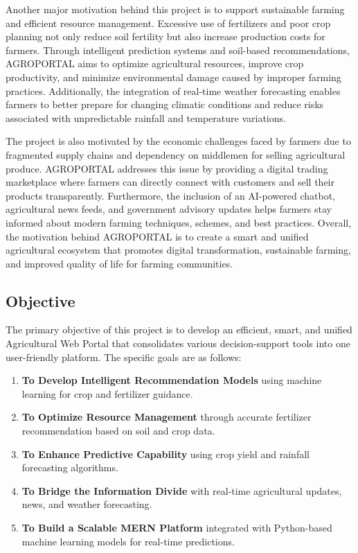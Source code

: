 Another major motivation behind this project is to support sustainable farming and efficient resource management. Excessive use of fertilizers and poor crop planning not only reduce soil fertility but also increase production costs for farmers. Through intelligent prediction systems and soil-based recommendations, AGROPORTAL aims to optimize agricultural resources, improve crop productivity, and minimize environmental damage caused by improper farming practices. Additionally, the integration of real-time weather forecasting enables farmers to better prepare for changing climatic conditions and reduce risks associated with unpredictable rainfall and temperature variations.

The project is also motivated by the economic challenges faced by farmers due to fragmented supply chains and dependency on middlemen for selling agricultural produce. AGROPORTAL addresses this issue by providing a digital trading marketplace where farmers can directly connect with customers and sell their products transparently. Furthermore, the inclusion of an AI-powered chatbot, agricultural news feeds, and government advisory updates helps farmers stay informed about modern farming techniques, schemes, and best practices. Overall, the motivation behind AGROPORTAL is to create a smart and unified agricultural ecosystem that promotes digital transformation, sustainable farming, and improved quality of life for farming communities.

\subsection{Objective}

The primary objective of this project is to develop an efficient, smart, and unified Agricultural Web Portal that consolidates various decision-support tools into one user-friendly platform. The specific goals are as follows:

\begin{enumerate}
    \item \textbf{To Develop Intelligent Recommendation Models} using machine learning for crop and fertilizer guidance.
    \item \textbf{To Optimize Resource Management} through accurate fertilizer recommendation based on soil and crop data.
    \item \textbf{To Enhance Predictive Capability} using crop yield and rainfall forecasting algorithms.
    \item \textbf{To Bridge the Information Divide} with real-time agricultural updates, news, and weather forecasting.
    \item \textbf{To Build a Scalable MERN Platform} integrated with Python-based machine learning models for real-time predictions.
\end{enumerate}
